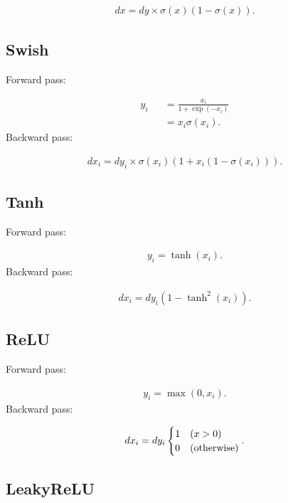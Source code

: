 \documentclass{article}
\begin{document}
\begin{eqnarray}
  dx = dy \times \sigma(x) (1 - \sigma(x)).
\end{eqnarray}


\subsection{Swish}

Forward pass:

\begin{eqnarray}
  y_i &&= \frac{x_i}{1 + \exp(-x_i)} \\
      &&= x_i \sigma(x_i).
\end{eqnarray}
%
Backward pass:

\begin{eqnarray}
  dx_i = dy_i \times \sigma(x_i) (1 + x_i (1 - \sigma(x_i))).
\end{eqnarray}

\subsection{Tanh}

Forward pass:

\begin{eqnarray}
  y_i = \tanh (x_i).    
\end{eqnarray}
%
Backward pass:

\begin{eqnarray}
  dx_i = dy_i (1 - \tanh^2(x_i)).
\end{eqnarray}


\subsection{ReLU}

Forward pass:

\begin{eqnarray}
  y_i = \max (0, x_i).
\end{eqnarray}
%
Backward pass:

\begin{eqnarray}
  dx_i = dy_i \begin{cases}
     1 & (x > 0) \\
     0 & ({\rm otherwise})
  \end{cases}.
\end{eqnarray}


\subsection{LeakyReLU}
\end{document}
